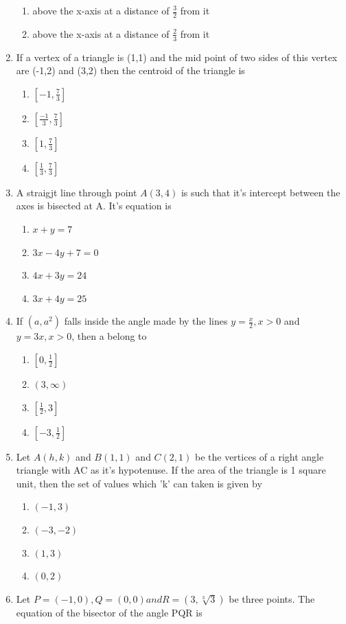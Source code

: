 \documentclass[12pt]{article}
\begin{document}
\begin{enumerate}
\begin{enumerate}
\item above the x-axis at a distance of $\frac{3}{2}$ from it
\item above the x-axis at a distance of $\frac{2}{3}$ from it
\end{enumerate}
\item If a vertex of a triangle is (1,1) and the mid point of two sides of this vertex are (-1,2) and (3,2) then the centroid of the triangle is 
\begin{enumerate}
\item $\left[-1,\frac{7}{3}\right]$ 
\item $\left[ \frac{-1}{3},\frac{7}{3}\right]$ 
\item $\left[1,\frac{7}{3}\right]$  
 \item $\left[ \frac{1}{3},\frac{7}{3}\right]$ 
\end{enumerate}
\item A straigjt line through point $A(3,4)$ is such that it's intercept between the axes is bisected at A. It's equation is
\begin{enumerate}
\item  $x+y=7$ 
\item $3x-4y+7=0$  
\item $4x+3y=24$ 
\item $3x+4y=25$
\end{enumerate}
\item If $(a,a^2)$ falls inside the angle made by the lines $y= \frac{x}{2}, x>0$ and $y=3x, x>0$, then a belong to 
\begin{enumerate}
\item $\left[ 0,\frac{1}{2}\right] $ 
\item $(3,\infty)$ 
\item $\left[\frac{1}{2},3\right]$ 
\item $\left[-3,\frac{1}{2}\right]$
\end{enumerate}
\item Let $A(h,k)$ and $B(1,1)$ and $C(2,1)$ be the vertices of a right angle triangle with AC as it's hypotenuse. If the area of the triangle is 1 square unit, then the set of values which 'k' can taken is given by
\begin{enumerate}
\item $(-1,3)$ 
\item $(-3,-2)$
\item$(1,3)$ 
\item $(0,2)$
\end{enumerate}
\item Let $P=(-1,0),Q=(0,0) and R=(3,\sqrt[3]{3})$ be three points. The equation of the bisector of the angle PQR is 

\end{enumerate}
\end{document}
